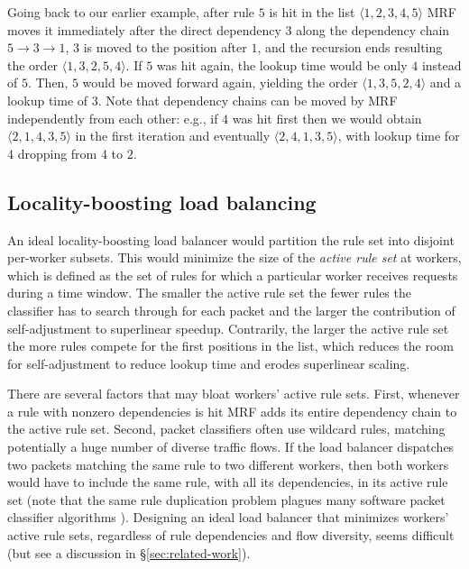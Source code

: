 Going back to our earlier example, after rule $5$ is hit in the list $\langle1, 2, 3, 4, 5\rangle$ MRF moves it immediately after the direct dependency $3$ along the dependency chain $5\to 3\to 1$, $3$ is moved to the position after $1$, and the recursion ends resulting the order $\langle1, 3, 2, 5, 4\rangle$. If $5$ was hit again, the lookup time would be only $4$ instead of $5$. Then, $5$ would be moved forward again, yielding the order $\langle1, 3, 5, 2, 4\rangle$ and a lookup time of $3$. Note that dependency chains can be moved by MRF independently from each other: e.g., if $4$ was hit first then we would obtain $\langle2, 1, 4, 3, 5\rangle$ in the first iteration and eventually $\langle2, 4, 1, 3, 5\rangle$, with lookup time for $4$ dropping from $4$ to $2$.

\subsection{Locality-boosting load balancing}
\label{sec:sa-rss}

An ideal locality-boosting load balancer would partition the rule set into disjoint per-worker subsets. This would minimize the size of the \emph{active rule set} at workers, which is defined as the set of rules for which a particular worker receives requests during a time window. The smaller the active rule set the fewer rules the classifier has to search through for each packet and the larger the contribution of self-adjustment to superlinear speedup. Contrarily, the larger the active rule set the more rules compete for the first positions in the list, which reduces the room for self-adjustment to reduce lookup time and erodes superlinear scaling.

There are several factors that may bloat workers' active rule sets. First, whenever a rule with nonzero dependencies is hit MRF adds its entire dependency chain to the active rule set. Second, packet classifiers often use wildcard rules, matching potentially a huge number of diverse traffic flows. If the load balancer dispatches two packets matching the same rule to two different workers, then both workers would have to include the same rule, with all its dependencies, in its active rule set (note that the same rule duplication problem plagues many software packet classifier algorithms \cite{10.1145/863955.863980, 820051, 10.1145/1851182.1851208, 8485947}). Designing an ideal load balancer that minimizes workers' active rule sets, regardless of rule dependencies and flow diversity, seems difficult (but see a discussion in \S\ref{sec:related-work}).

